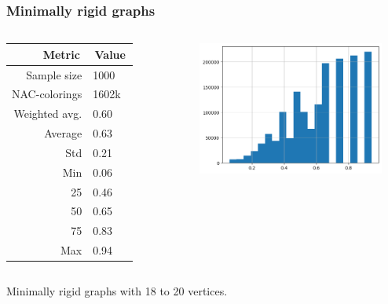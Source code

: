 \documentclass[aspectratio=\myaspectratio]{beamer}
\begin{document}
\begin{frame}
	\frametitle{Minimally rigid graphs}
	\begin{columns}

		\begin{table}[ht]
			\centering
			\begin{tabular}{r|l}
				\toprule
				\,Metric\,    & \,Value\, \\
				\midrule
				Sample size   & 1000      \\
				NAC-colorings & 1602k     \\
				Weighted avg. & 0.60      \\
				Average       & 0.63      \\
				Std           & 0.21      \\
				Min           & 0.06      \\
				25            & 0.46      \\
				50            & 0.65      \\
				75            & 0.83      \\
				Max           & 0.94      \\
				\bottomrule
			\end{tabular}
		\end{table}


		\includegraphics[width=0.9\textwidth]{./assets/presentation_reviewer_minimally_rigid.png}
	\end{columns}

	\centering
	Minimally rigid graphs with 18 to 20 vertices.
\end{frame}
\end{document}
